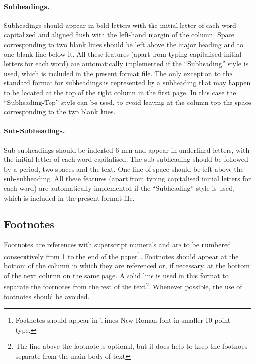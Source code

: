 \documentclass{stabs21}
\begin{document}
\begin{multicols}{2}
\paragraph{Subheadings.}

Subheadings should appear in bold letters with the initial letter of
each word capitalized and aligned flush with the left-hand margin of
the column. Space corresponding to two blank lines should be left
above the major heading and to one blank line below it. All these
features (apart from typing capitalised initial letters for each word)
are automatically implemented if the ``Subheading'' style is used,
which is included in the present format file. The only exception to
the standard format for subheadings is represented by a subheading
that may happen to be located at the top of the right column in the
first page. In this case the ``Subheading-Top'' style can be used, to
avoid leaving at the column top the space corresponding to the two
blank lines.

\paragraph{Sub-Subheadings.}

Sub-subheadings should be indented 6 mm and appear in underlined
letters, with the initial letter of each word capitalised. The
sub-subheading should be followed by a period, two spaces and the
text. One line of space should be left above the sub-subheading. All
these features (apart from typing capitalised initial letters for
each word) are automatically implemented if the ``Subheading'' style
is used, which is included in the present format file.

\subsection{Footnotes}

Footnotes are references with superscript numerals and are to be
numbered consecutively from 1 to the end of the
paper\footnote{Footnotes should appear in Times New Roman font in
  smaller 10 point type.}. Footnotes should appear at the bottom of
the column in which they are referenced or, if necessary, at the
bottom of the next column on the same page. A solid line is used in
this format to separate the footnotes from the rest of the
text\footnote{The line above the footnote is optional, but it does
  help to keep the footnoes separate from the main body of
  text}. Whenever possible, the use of footnotes should be avoided.


\end{multicols}
\end{document}
